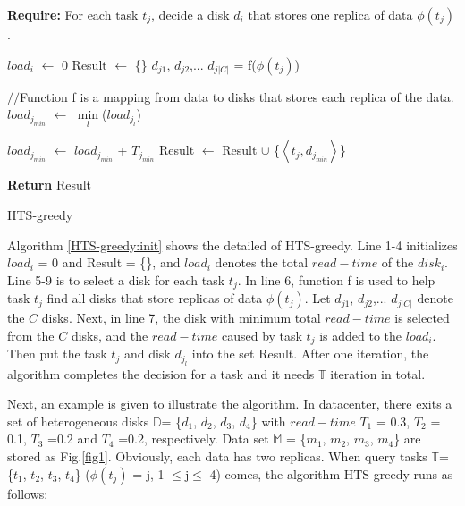 \documentclass[conference]{IEEEtran}
\begin{document}
\begin{algorithm}
	
	\textbf{Require:} For each task $t_j$, decide a disk $d_i$ that stores one replica of data $\phi(t_j)$.

	\begin{algorithmic}[1]
		 \label{HTS-greedy:init}
			\State $load_{i}$ $\gets$ 0
		\EndFor
		\State Result $\gets$ \{\}
			\State $d_{j1}$, $d_{j2}$,... $d_{j|C|}$ = f($\phi(t_j)$)
		
			$//$Function f is a mapping from data to disks that stores each replica of the data.
			\State $load_{j_{min}}$ $\gets$ $\min\limits_{l}$($load_{j_l}$)
			
			$load_{j_{min}}$ $\gets$ $load_{j_{min}}$ + $T_{j_{min}}$
			\State Result $\gets$ Result $\cup$
			\{$\left \langle t_j, d_{j_{min}}\right \rangle$\}
		\EndFor
	
	\State \textbf{Return} Result
	\end{algorithmic}
	\caption{HTS-greedy}\label{HTS-greedy}
\end{algorithm}

Algorithm \ref{HTS-greedy:init} shows the detailed of HTS-greedy. Line 1-4 initializes $load_i$ = 0 and Result = \{\}, and $load_i$ denotes the total $read-time$ of the $disk_i$. Line 5-9 is to select a disk for each task $t_j$. In line 6, function f is used to help task $t_j$ find all disks that store replicas of data $\phi(t_j)$. Let $d_{j1}$, $d_{j2}$,... $d_{j|C|}$ denote the $C$ disks. Next, in line 7, the disk with minimum total $read-time$ is selected from the $C$ disks, and the $read-time$ caused by task $t_j$ is added to the $load_i$. Then put the task $t_j$ and disk $d_{j_l}$ into the set Result. After one iteration, the algorithm completes the decision for a task and it needs $\mathbb{T}$ iteration in total.

Next, an example is given to illustrate the algorithm. In datacenter, there exits a set of heterogeneous disks $\mathbb{D}$= \{$d_1$, $d_2$, $d_3$, $d_4$\} with $read-time$ $T_1$ = 0.3,  $T_2$ = 0.1,  $T_3$ =0.2 and $T_4$ =0.2, respectively. Data set $\mathbb{M}$ = \{$m_1$, $m_2$, $m_3$, $m_4$\} are stored as Fig.\ref{fig1}. Obviously, each data has two replicas. When query tasks $\mathbb{T}$= \{$t_1$, $t_2$, $t_3$, $t_4$\} ($\phi(t_j)$ = j, 1 $\leq$j$ \leq$ 4) comes, the algorithm HTS-greedy runs as follows: %
\end{document}
